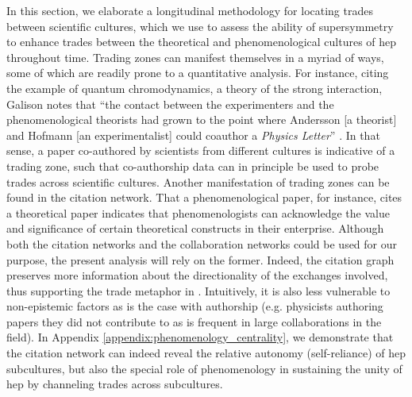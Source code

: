 \documentclass[smallextended]{svjour3}
\begin{document}
In this section, we elaborate a longitudinal methodology for locating trades between scientific cultures, which we use to assess the ability of supersymmetry to enhance trades between the theoretical and phenomenological cultures of \gls{hep} throughout time. Trading zones can manifest themselves in a myriad of ways, some of which are readily prone to a quantitative analysis. %
For instance, citing the example of quantum chromodynamics, a theory of the strong interaction, Galison notes that ``the contact between the experimenters and the phenomenological theorists had grown to the point where Andersson [a theorist] and Hofmann [an experimentalist] could coauthor a \textit{Physics Letter}'' \citep[p.~655]{galison1997image}. In that sense, a paper co-authored by scientists from different cultures is indicative of a trading zone, such that co-authorship data can in principle be used to probe trades across scientific cultures. Another manifestation of trading zones can be found in the citation network. That a phenomenological paper, for instance, cites a theoretical paper indicates that phenomenologists can acknowledge the value and significance of certain theoretical constructs in their enterprise. Although both the citation networks and the collaboration networks could be used for our purpose, the present analysis will rely on the former. Indeed, the citation graph preserves more information about the directionality of the exchanges involved, thus supporting the trade metaphor in \citealt{Yan2013}. Intuitively, it is also less vulnerable to non-epistemic factors as is the case with authorship (e.g. physicists authoring papers they did not contribute to as is frequent in large collaborations in the field). In Appendix \ref{appendix:phenomenology_centrality}, we demonstrate that the citation network can indeed reveal the relative autonomy (self-reliance) of \gls{hep} subcultures, but also the special role of phenomenology in sustaining the unity of \gls{hep} by channeling trades across subcultures.
\end{document}
